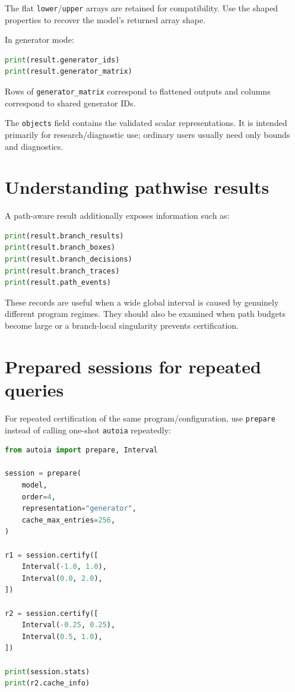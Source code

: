 \documentclass[11pt]{article}
\begin{document}
The flat \texttt{lower}/\texttt{upper} arrays are retained for compatibility.
Use the shaped properties to recover the model's returned array shape.

In generator mode:
\begin{lstlisting}[language=Python]
print(result.generator_ids)
print(result.generator_matrix)
\end{lstlisting}
Rows of \texttt{generator\_matrix} correspond to flattened outputs and columns
correspond to shared generator IDs.

The \texttt{objects} field contains the validated scalar representations.  It is
intended primarily for research/diagnostic use; ordinary users usually need only
bounds and diagnostics.

\section{Understanding pathwise results}

A path-aware result additionally exposes information such as:
\begin{lstlisting}[language=Python]
print(result.branch_results)
print(result.branch_boxes)
print(result.branch_decisions)
print(result.branch_traces)
print(result.path_events)
\end{lstlisting}

These records are useful when a wide global interval is caused by genuinely
different program regimes.  They should also be examined when path budgets become
large or a branch-local singularity prevents certification.

\section{Prepared sessions for repeated queries}

For repeated certification of the same program/configuration, use \texttt{prepare}
instead of calling one-shot \texttt{autoia} repeatedly:
\begin{lstlisting}[language=Python]
from autoia import prepare, Interval

session = prepare(
    model,
    order=4,
    representation="generator",
    cache_max_entries=256,
)

r1 = session.certify([
    Interval(-1.0, 1.0),
    Interval(0.0, 2.0),
])

r2 = session.certify([
    Interval(-0.25, 0.25),
    Interval(0.5, 1.0),
])

print(session.stats)
print(r2.cache_info)
\end{lstlisting}
\end{document}
